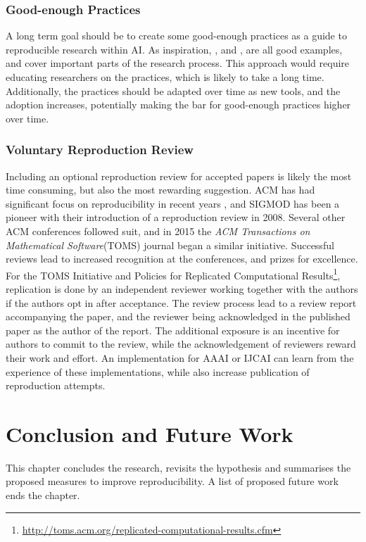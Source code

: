 \subsection{Good-enough Practices}
A long term goal should be to create some good-enough practices as a guide to reproducible research within AI. As inspiration, \cite{stodden2014best-practices}, \cite{WilsonBCKNT16} and \cite{Sandve_2013}, are all good examples, and cover important parts of the research process. This approach would require educating researchers on the practices, which is likely to take a long time. Additionally, the practices should be adapted over time as new tools, and the adoption increases, potentially making the bar for good-enough practices higher over time.

\subsection{Voluntary Reproduction Review}
Including an optional reproduction review for accepted papers is likely the most time consuming, but also the most rewarding suggestion. ACM has had significant focus on reproducibility in recent years \citep{Boisvert:2016}, and SIGMOD has been a pioneer with their introduction of a reproduction review in 2008. Several other ACM conferences followed suit, and in 2015 the \emph{ACM Transactions on Mathematical Software}(TOMS) journal began a similar initiative. Successful reviews lead to increased recognition at the conferences, and prizes for excellence. For the TOMS Initiative and Policies for Replicated Computational Results\footnote{\url{http://toms.acm.org/replicated-computational-results.cfm}}, replication is done by an independent reviewer working together with the authors if the authors opt in after acceptance. The review process lead to a review report accompanying the paper, and the reviewer being acknowledged in the published paper as the author of the report. The additional exposure is an incentive for authors to commit to the review, while the acknowledgement of reviewers reward their work and effort. An implementation for AAAI or IJCAI can learn from the experience of these implementations, while also increase publication of reproduction attempts.

\cleardoublepage

\chapter{Conclusion and Future Work}
This chapter concludes the research, revisits the hypothesis and summarises the proposed measures to improve reproducibility. A list of proposed future work ends the chapter.

